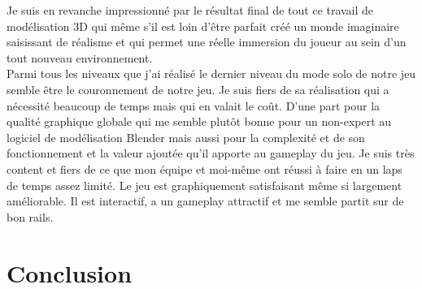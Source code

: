 \documentclass[12pt]{article}
\begin{document}
Je suis en revanche impressionné par le résultat final de tout ce travail de modélisation 3D qui même s’il est loin d’être parfait créé un monde imaginaire saisissant de réalisme et qui permet une réelle immersion du joueur au sein d’un tout nouveau environnement.\\
Parmi tous les niveaux que j’ai réalisé le dernier niveau du mode solo de notre jeu semble être le couronnement de notre jeu. Je suis fiers de sa réalisation qui a nécessité beaucoup de temps mais qui en valait le coût. D’une part pour la qualité graphique globale qui me semble plutôt bonne pour un non-expert au logiciel de modélisation Blender mais aussi pour la complexité et de son fonctionnement et la valeur ajoutée qu’il apporte au gameplay du jeu. 
Je suis très content et fiers de ce que mon équipe et moi-même ont réussi à faire en un laps de temps assez limité. Le jeu est graphiquement satisfaisant même si largement améliorable. Il est interactif, a un gameplay attractif et me semble partit sur de bon rails.




\newpage

\section*{Conclusion}
\end{document}

